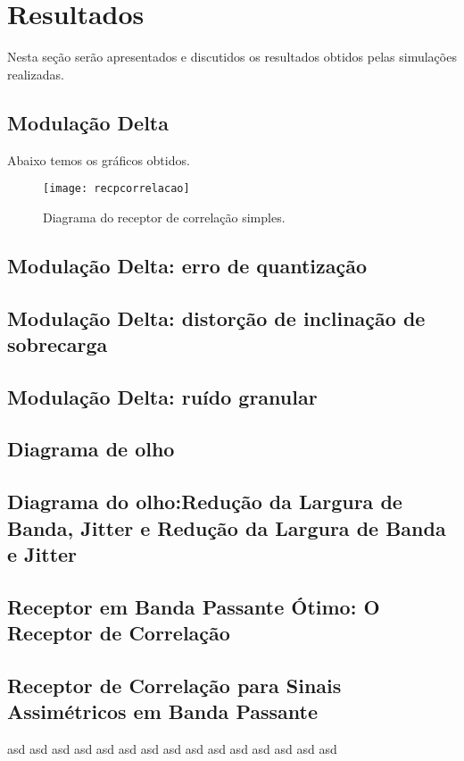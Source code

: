 \newpage
\section{Resultados}
Nesta seção serão apresentados e discutidos os resultados obtidos pelas simulações realizadas.

\subsection{Modulação Delta}

Abaixo temos os gráficos obtidos.

\begin{figure}[H]
    \centering
    \texttt{[image: recpcorrelacao]}
    \caption{Diagrama do receptor de correlação simples.}
    \label{fig:receptorcorr}
\end{figure}

\subsection{Modulação Delta: erro de quantização}

\subsection{Modulação Delta: distorção de inclinação de sobrecarga}

\subsection{Modulação Delta: ruído granular}

\subsection{Diagrama de olho}

\subsection{Diagrama do olho:Redução da Largura de Banda, Jitter e Redução da Largura de Banda e Jitter}

\subsection{Receptor em Banda Passante Ótimo: O Receptor de Correlação}

\subsection{Receptor de Correlação para Sinais Assimétricos em Banda Passante}
\newpage

asd
\newpage
asd
\newpage
asd
\newpage
asd
\newpage
asd
\newpage
asd
\newpage
asd
\newpage
asd
\newpage
asd
\newpage
asd
\newpage
asd
\newpage
asd
\newpage
asd
\newpage
asd
\newpage
asd